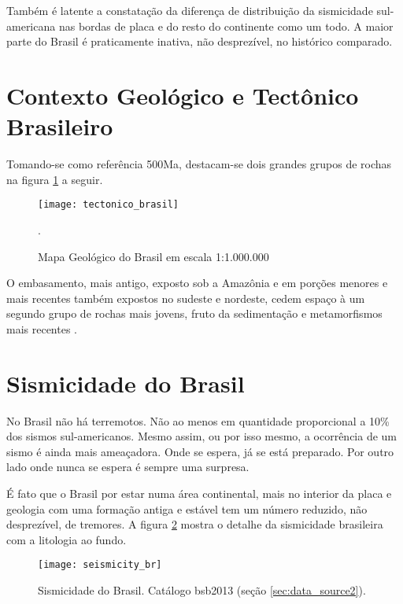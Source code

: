 Também é latente a constatação da diferença de distribuição da sismicidade sul-americana nas bordas de placa e do
resto do continente como um todo. A maior parte do Brasil é praticamente inativa, não desprezível, no histórico
comparado.

\section{Contexto Geológico e Tectônico Brasileiro}
\label{sec:geotec_bras}

Tomando-se como referência 500Ma, destacam-se dois grandes grupos de rochas na figura \ref{fig:br_tec}
\citet{bizzi_2003} a seguir.

\begin{figure}[H]
  \centering
  \texttt{[image: tectonico\_brasil]} 
  \caption{Mapa Geológico do Brasil em escala 1:1.000.000}.
  \label{fig:br_tec} 
\end{figure}

O embasamento, mais antigo, exposto sob a Amazônia e em porções menores e mais recentes também expostos 
no sudeste e nordeste, cedem espaço à um segundo grupo de rochas mais jovens, fruto da sedimentação e metamorfismos
mais recentes \citep{bizzi_2003}.


\section{Sismicidade do Brasil}
\label{sec:sismicidade_brasil}

No Brasil não há terremotos. Não ao menos em quantidade proporcional a 10\% dos sismos sul-americanos.
Mesmo assim, ou por isso mesmo, a ocorrência de um sismo é ainda mais ameaçadora. Onde se espera, 
já se está preparado. Por outro lado onde nunca se espera é sempre uma surpresa.

É fato que o Brasil por estar numa área continental, mais no interior da placa \citep{talwani_2014} e geologia
com uma formação antiga e estável tem um número reduzido, não desprezível, de tremores. 
A figura \ref{fig:br_seis} mostra o detalhe da sismicidade brasileira com a litologia ao fundo.


\begin{figure}[H]
  \centering
  \texttt{[image: seismicity\_br]} 
  \caption{Sismicidade do Brasil. Catálogo \gls{bsb2013} (seção \ref{sec:data_source2}).}
  \label{fig:br_seis} 
\end{figure}

